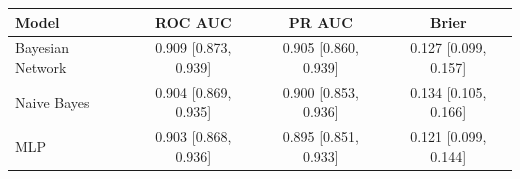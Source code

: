 \begin{tabular}{lccc}
\toprule
Model & ROC AUC & PR AUC & Brier \\
\midrule
Bayesian Network & 0.909 [0.873, 0.939] & 0.905 [0.860, 0.939] & 0.127 [0.099, 0.157] \\
Naive Bayes & 0.904 [0.869, 0.935] & 0.900 [0.853, 0.936] & 0.134 [0.105, 0.166] \\
MLP & 0.903 [0.868, 0.936] & 0.895 [0.851, 0.933] & 0.121 [0.099, 0.144] \\
\bottomrule
\end{tabular}
